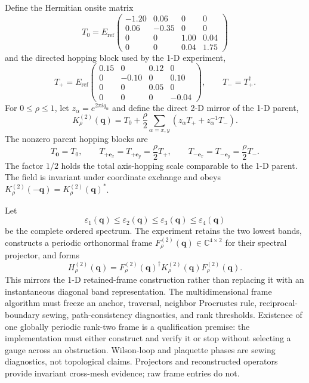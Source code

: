 \documentclass[11pt]{article}
\begin{document}
Define the Hermitian onsite matrix
\begin{equation}
 T_0=E_{\mathrm{ref}}
 \begin{pmatrix}
 -1.20&0.06&0&0\\
 0.06&-0.35&0&0\\
 0&0&1.00&0.04\\
 0&0&0.04&1.75
 \end{pmatrix}
\end{equation}
and the directed hopping block used by the 1-D experiment,
\begin{equation}
 T_+=E_{\mathrm{ref}}
 \begin{pmatrix}
 0.15&0&0.12&0\\
 0&-0.10&0&0.10\\
 0&0&0.05&0\\
 0&0&0&-0.04
 \end{pmatrix},
 \qquad T_-=T_+^\dagger.
\end{equation}
For $0\le\rho\le1$, let $z_\alpha=e^{2\pi iq_\alpha}$ and define the direct
2-D mirror of the 1-D parent,
\begin{equation}
 K_\rho^{(2)}(\mathbf q)
 =T_0+\frac\rho2\sum_{\alpha=x,y}
 \left(z_\alpha T_+ +z_\alpha^{-1}T_-\right).
 \label{eq:parent}
\end{equation}
The nonzero parent hopping blocks are
\begin{equation}
 T_{\mathbf0}=T_0,
 \qquad
 T_{+\mathbf e_x}=T_{+\mathbf e_y}=\frac\rho2T_+,
 \qquad
 T_{-\mathbf e_x}=T_{-\mathbf e_y}=\frac\rho2T_-.
\end{equation}
The factor $1/2$ holds the total axis-hopping scale comparable to the 1-D parent. The
field is invariant under coordinate exchange and obeys
$K_\rho^{(2)}(-\mathbf q)=K_\rho^{(2)}(\mathbf q)^*$.

Let
\begin{equation}
 \varepsilon_1(\mathbf q)\le\varepsilon_2(\mathbf q)
 \le\varepsilon_3(\mathbf q)\le\varepsilon_4(\mathbf q)
\end{equation}
be the complete ordered spectrum. The experiment retains the two lowest bands, constructs a periodic orthonormal frame
$F_\rho^{(2)}(\mathbf q)\in\mathbb C^{4\times2}$ for their spectral projector, and forms
\begin{equation}
 H_\rho^{(2)}(\mathbf q)
 =F_\rho^{(2)}(\mathbf q)^\dagger
  K_\rho^{(2)}(\mathbf q)F_\rho^{(2)}(\mathbf q).
 \label{eq:retained-reference}
\end{equation}
This mirrors the 1-D retained-frame construction rather than replacing it with an
instantaneous diagonal band representation. The multidimensional frame algorithm must
freeze an anchor, traversal, neighbor Procrustes rule, reciprocal-boundary sewing,
path-consistency diagnostics, and rank thresholds. Existence of one globally periodic
rank-two frame is a qualification premise: the implementation must either construct and
verify it or stop without selecting a gauge across an obstruction. Wilson-loop and
plaquette phases are sewing diagnostics, not topological claims. Projectors and
reconstructed operators provide invariant cross-mesh evidence; raw frame entries do
not.
\end{document}
